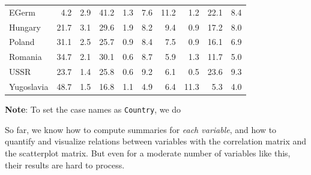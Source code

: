 \documentclass[]{book}
\newenvironment{Shaded}{\begin{snugshade}}{\end{snugshade}}
\newcommand{\KeywordTok}[1]{\textcolor[rgb]{0.13,0.29,0.53}{\textbf{#1}}}
\newcommand{\StringTok}[1]{\textcolor[rgb]{0.31,0.60,0.02}{#1}}
\newcommand{\OtherTok}[1]{\textcolor[rgb]{0.56,0.35,0.01}{#1}}
\newcommand{\OperatorTok}[1]{\textcolor[rgb]{0.81,0.36,0.00}{\textbf{#1}}}
\newcommand{\NormalTok}[1]{#1}
\theoremstyle{definition}
\theoremstyle{definition}
\theoremstyle{definition}
\theoremstyle{remark}
\begin{document}
\begin{longtable}[t]{lrrrrrrrrr}
\addlinespace
EGerm & 4.2 & 2.9 & 41.2 & 1.3 & 7.6 & 11.2 & 1.2 & 22.1 & 8.4\\
Hungary & 21.7 & 3.1 & 29.6 & 1.9 & 8.2 & 9.4 & 0.9 & 17.2 & 8.0\\
Poland & 31.1 & 2.5 & 25.7 & 0.9 & 8.4 & 7.5 & 0.9 & 16.1 & 6.9\\
Romania & 34.7 & 2.1 & 30.1 & 0.6 & 8.7 & 5.9 & 1.3 & 11.7 & 5.0\\
USSR & 23.7 & 1.4 & 25.8 & 0.6 & 9.2 & 6.1 & 0.5 & 23.6 & 9.3\\
Yugoslavia & 48.7 & 1.5 & 16.8 & 1.1 & 4.9 & 6.4 & 11.3 & 5.3 & 4.0\\
\bottomrule
\end{longtable}

\textbf{Note}: To set the case names as \texttt{Country}, we do

\begin{Shaded}
\end{Shaded}

So far, we know how to compute summaries for \emph{each variable}, and
how to quantify and visualize relations between variables with the
correlation matrix and the scatterplot matrix. But even for a moderate
number of variables like this, their results are hard to process.
\end{document}
